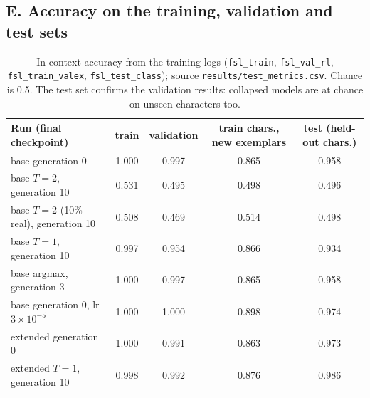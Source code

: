 \subsection*{E. Accuracy on the training, validation and test sets}
\begin{table}[H]\centering\small
\begin{tabular}{lcccc}\toprule
Run (final checkpoint) & train & validation & train chars., new exemplars & test (held-out chars.)\\\midrule
base generation 0 & 1.000 & 0.997 & 0.865 & 0.958\\
base $T{=}2$, generation 10 & 0.531 & 0.495 & 0.498 & 0.496\\
base $T{=}2$ (10\% real), generation 10 & 0.508 & 0.469 & 0.514 & 0.498\\
base $T{=}1$, generation 10 & 0.997 & 0.954 & 0.866 & 0.934\\
base argmax, generation 3 & 1.000 & 0.997 & 0.865 & 0.958\\
base generation 0, lr $3{\times}10^{-5}$ & 1.000 & 1.000 & 0.898 & 0.974\\
extended generation 0 & 1.000 & 0.991 & 0.863 & 0.973\\
extended $T{=}1$, generation 10 & 0.998 & 0.992 & 0.876 & 0.986\\
\bottomrule\end{tabular}
\caption{In-context accuracy from the training logs (\texttt{fsl\_train}, \texttt{fsl\_val\_rl},
\texttt{fsl\_train\_valex}, \texttt{fsl\_test\_class}); source \texttt{results/test\_metrics.csv}.
Chance is 0.5. The test set confirms the validation results: collapsed models are at chance on unseen
characters too.}
\end{table}
